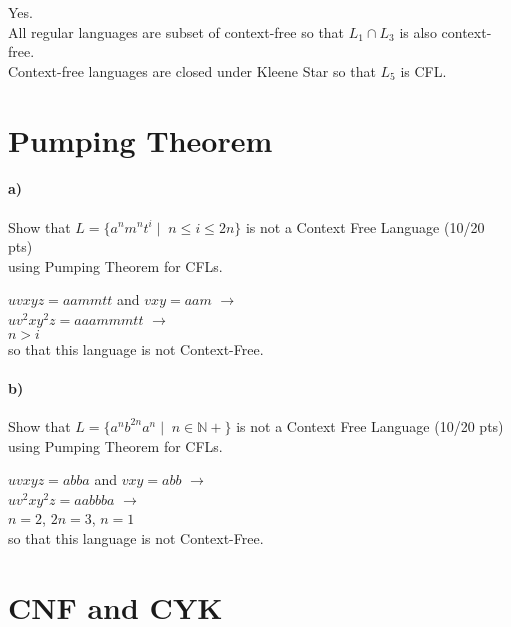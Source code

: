\documentclass[a4paper,12pt]{article}
\begin{document}
\begin{tcolorbox}
Yes.\\
All regular languages are subset of context-free so that $L_1 \cap L_3$ is also context-free. \\
Context-free languages are closed under Kleene Star so that $L_5$ is CFL.
\end{tcolorbox}





\newpage
\section{Pumping Theorem \hfill {}}

\paragraph{a)} Show that $L=\{a^n m^n t^i \mid \; n\leq i \leq 2n\}$ is not a Context Free Language \hfill \small{(10/20 pts)} \\
using Pumping Theorem for CFLs. \\

\begin{tcolorbox}
$uvxyz=aammtt$ and $vxy=aam$ $\rightarrow$ \\
$uv^2xy^2z=aaammmtt$ $\rightarrow$ \\
$n > i$\\
so that this language is not Context-Free.
\end{tcolorbox}


\paragraph{b)} Show that $L=\{a^n b^{2n} a^n \mid \; n \in \mathbb{N+} \}$ is not a Context Free Language \hfill \small{(10/20 pts)} \\
using Pumping Theorem for CFLs. \\

\begin{tcolorbox}
$uvxyz=abba$ and $vxy = abb$ $\rightarrow$\\
$uv^2xy^2z=aabbba$ $\rightarrow$ \\
$n = 2$, $2n = 3$, $n=1$ \\
so that this language is not Context-Free.
\end{tcolorbox}





\newpage
\section{CNF and CYK \hfill {}}
\end{document}
